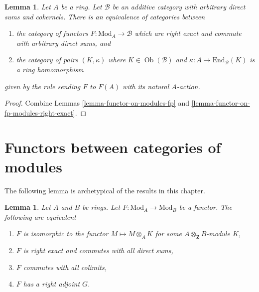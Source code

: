 \documentclass{stacks-project}
\theoremstyle{plain}
\newtheorem{lemma}[subsection]{Lemma}
\theoremstyle{definition}
\theoremstyle{remark}
\numberwithin{equation}{subsection}
\def\Ob{\mathop{\mathrm{Ob}}\nolimits}
\begin{document}
\begin{lemma}
\label{lemma-functor-on-modules}
Let $A$ be a ring. Let $\mathcal{B}$ be an additive category
with arbitrary direct sums and cokernels. There is an equivalence
of categories between
\begin{enumerate}
\item the category of functors $F : \text{Mod}_A \to \mathcal{B}$
which are right exact and commute with arbitrary direct sums, and
\item the category of pairs $(K, \kappa)$ where $K \in \Ob(\mathcal{B})$
and $\kappa : A \to \text{End}_\mathcal{B}(K)$ is a ring homomorphism
\end{enumerate}
given by the rule sending $F$ to $F(A)$ with its natural $A$-action.
\end{lemma}

\begin{proof}
Combine Lemmas \ref{lemma-functor-on-modules-fp} and
\ref{lemma-functor-on-fp-modules-right-exact}.
\end{proof}






\section{Functors between categories of modules}
\label{section-functors}

\noindent
The following lemma is archetypical of the results in this chapter.

\begin{lemma}
\label{lemma-functor}
Let $A$ and $B$ be rings. Let $F : \text{Mod}_A \to \text{Mod}_B$
be a functor. The following are equivalent
\begin{enumerate}
\item $F$ is isomorphic to the functor $M \mapsto M \otimes_A K$
for some $A \otimes_\mathbf{Z} B$-module $K$,
\item $F$ is right exact and commutes with all direct sums,
\item $F$ commutes with all colimits,
\item $F$ has a right adjoint $G$.
\end{enumerate}
\end{lemma}
\end{document}
